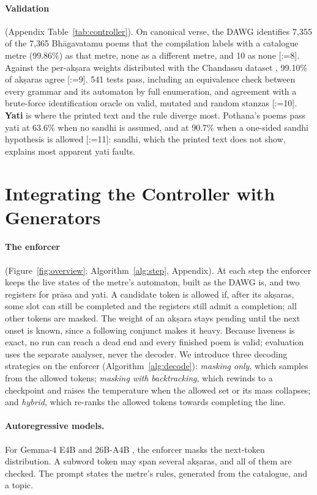 \documentclass[11pt]{article}
\makeatletter
\DeclareRobustCommand{\exref}[1]{{\scriptsize[\def\ex@sep{}\@for\ex@i:=#1\do{\ex@sep
  \expandafter\ex@item\expandafter{\ex@i}\def\ex@sep{, }}]}}
\newcommand{\ex@item}[1]{\in@{-}{#1}\ifin@\ex@range#1\@nil\else\ex@link{#1}\fi}
\def\ex@range#1-#2\@nil{\ex@link{#1}--\ex@link{#2}}
\newcommand{\ex@link}[1]{\hyperref[exp:E#1]{E#1}}
\makeatother
\begin{document}
\paragraph{Validation} (Appendix Table~\ref{tab:controller}). On canonical verse, the DAWG identifies 7,355 of the
7,365 Bhāgavatamu poems that the compilation labels with a catalogue metre (99.86\%) as that metre, none as
a different metre, and 10 as none \exref{8}. Against the per-akṣara weights distributed with the Chandassu dataset
\citep{boddu2025chandassu}, 99.10\% of akṣaras agree \exref{9}. 541 tests pass, including an equivalence check between
every grammar and its automaton by full enumeration, and agreement with a brute-force identification oracle
on valid, mutated and random stanzas \exref{10}. \textbf{Yati} is where the printed text and the rule diverge most.
Pothana's poems pass yati at 63.6\% when no sandhi is assumed, and at 90.7\% when a one-sided sandhi
hypothesis is allowed \exref{11}: sandhi, which the printed text does not show, explains most apparent yati faults.


\section{Integrating the Controller with Generators}\label{sec:integration}

\paragraph{The enforcer} (Figure~\ref{fig:overview}; Algorithm~\ref{alg:step}, Appendix). At each step the
enforcer keeps the live states of the metre's automaton, built as the DAWG is, and two registers for prāsa
and yati. A candidate token is allowed if, after its akṣaras, some slot can still be completed and the
registers still admit a completion; all other tokens are masked. The weight of an akṣara stays pending until
the next onset is known, since a following conjunct makes it heavy. Because liveness is exact, no run can
reach a dead end and every finished poem is valid; evaluation uses the separate analyser, never the
decoder. We introduce three decoding strategies on the enforcer (Algorithm~\ref{alg:decode}):
\emph{masking only}, which samples from the allowed tokens; \emph{masking with backtracking}, which rewinds to
a checkpoint and raises the temperature when the allowed set or its mass collapses; and \emph{hybrid}, which
re-ranks the allowed tokens towards completing the line.

\paragraph{Autoregressive models.} For Gemma-4 E4B and 26B-A4B
\citep{gemma4_2026,hf_gemma4_e4b,hf_gemma4_26b}, the enforcer masks the next-token distribution. A subword
token may span several akṣaras, and all of them are checked. The prompt states the metre's rules, generated
from the catalogue, and a topic.
\end{document}
